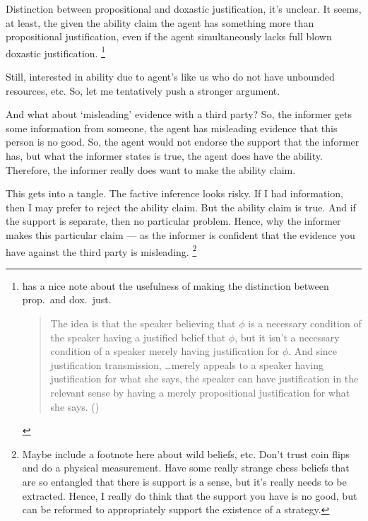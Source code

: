 \documentclass[10pt]{article}
\begin{document}
Distinction between propositional and doxastic justification, it's unclear.
It seems, at least, the given the ability claim the agent has something more than propositional justification, even if the agent simultaneously lacks full blown doxastic justification.\nolinebreak
\footnote{
  \textcite{Wright:2016wl} has a nice note about the usefulness of making the distinction between prop.\ and dox.\ just.\
  \begin{quote}
    The idea is that the speaker believing that \(\phi\) is a necessary condition of the speaker having a justiﬁed belief that \(\phi\), but it isn't a necessary condition of a speaker merely having justification for \(\phi\).
    And since justification transmission, \dots merely appeals to a speaker having justification for what she says, the speaker can have justification in the relevant sense by having a merely propositional justification for what she says.\nolinebreak
    \mbox{}\hfill\mbox{(\citeyear[10]{Wright:2016wl})}
  \end{quote}
}

Still, interested in ability due to agent's like us who do not have unbounded resources, etc.
So, let me tentatively push a stronger argument.

\begin{note}[Misleading]
  And what about `misleading' evidence with a third party?
  So, the informer gets some information from someone, the agent has misleading evidence that this person is no good.
  So, the agent would not endorse the support that the informer has, but what the informer states is true, the agent does have the ability.
  Therefore, the informer really does want to make the ability claim.

  This gets into a tangle.
  The factive inference looks risky.
  If I had information, then I may prefer to reject the ability claim.
  But the ability claim is true.
  And if the support is separate, then no particular problem.
  Hence, why the informer makes this particular claim --- as the informer is confident that the evidence you have against the third party is misleading.\nolinebreak
  \footnote{
    Maybe include a footnote here about wild beliefs, etc.
    Don't trust coin flips and do a physical measurement.
    Have some really strange chess beliefs that are so entangled that there is support is a sense, but it's really needs to be extracted.
    Hence, I really do think that the support you have is no good, but can be reformed to appropriately support the existence of a strategy.
  }
\end{note}
\end{document}
